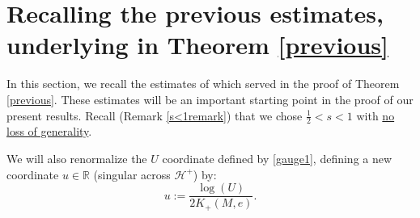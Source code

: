 \documentclass[10pt,a4paper]{article}
\theoremstyle{plain}
\theoremstyle{remark}
\theoremstyle{definition}
\newcommand{\RR}{\mathbb{R}}
\theoremstyle{plain}
\theoremstyle{remark}
\theoremstyle{definition}
\numberwithin{equation}{section}
\begin{document}
\section{Recalling the previous estimates, underlying in Theorem \ref{previous}} \label{LB}
In this section, we recall the estimates of \cite{Moi} which served in the proof of Theorem \ref{previous}. These estimates will be an important starting point in the proof of our present results. Recall (Remark \ref{s<1remark}) that we chose $\frac{1}{2} < s <1$ with \underline{no loss of generality}.

We will also renormalize the $U$ coordinate defined by \eqref{gauge1}, defining a new coordinate $u \in \RR$ (singular across $\mathcal{H}^+$) by: \begin{equation} \label{gauge1.5}
u:= \frac{\log(U)}{2K_+(M,e)}.
\end{equation}
\end{document}
